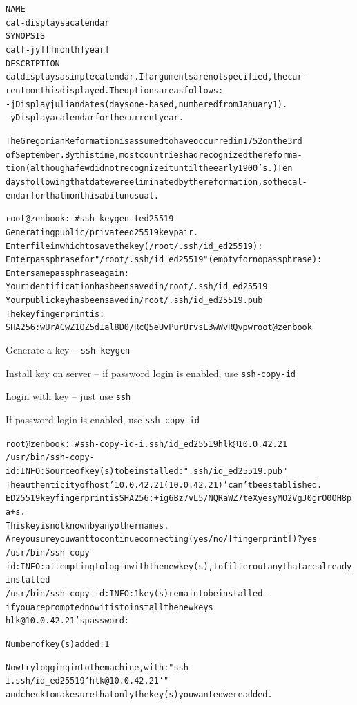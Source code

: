 \documentclass[Screen16to9,17pt]{foils}
\begin{document}
\begin{alltt}\footnotesize
\small
NAME
     cal - displays a calendar
SYNOPSIS
     cal [-jy] [[month]  year]
DESCRIPTION
   cal displays a simple calendar.  If arguments are not specified, the cur-
   rent month is displayed.  The options are as follows:
   -j      Display julian dates (days one-based, numbered from January 1).
   -y      Display a calendar for the current year.

The Gregorian Reformation is assumed to have occurred in 1752 on the 3rd
of September.  By this time, most countries had recognized the reforma-
tion (although a few did not recognize it until the early 1900's.)  Ten
days following that date were eliminated by the reformation, so the cal-
endar for that month is a bit unusual.
\end{alltt}




\begin{alltt}\footnotesize
root@zenbook:~# ssh-keygen -t ed25519
Generating public/private ed25519 key pair.
Enter file in which to save the key (/root/.ssh/id_ed25519):
Enter passphrase for "/root/.ssh/id_ed25519" (empty for no passphrase):
Enter same passphrase again:
Your identification has been saved in /root/.ssh/id_ed25519
Your public key has been saved in /root/.ssh/id_ed25519.pub
The key fingerprint is:
SHA256:wUrACwZ1OZ5dIal8D0/RcQ5eUvPurUrvsL3wWvRQvpw root@zenbook
\end{alltt}


\begin{list2}
\item[1] Generate a key -- \verb+ssh-keygen+
\item[2] Install key on server -- if password login is enabled, use \verb+ssh-copy-id+
\item[3] Login with key -- just use \verb+ssh+
\end{list2}




If password login is enabled, use \verb+ssh-copy-id+

\begin{alltt}\footnotesize
root@zenbook:~# ssh-copy-id -i .ssh/id_ed25519 hlk@10.0.42.21
/usr/bin/ssh-copy-id: INFO: Source of key(s) to be installed: ".ssh/id_ed25519.pub"
The authenticity of host '10.0.42.21 (10.0.42.21)' can't be established.
ED25519 key fingerprint is SHA256:+ig6Bz7vL5/NQRaWZ7teXyesyMO2VgJ0grO0OH8pa+s.
This key is not known by any other names.
Are you sure you want to continue connecting (yes/no/[fingerprint])? yes
/usr/bin/ssh-copy-id: INFO: attempting to log in with the new key(s), to filter out any that are already installed
/usr/bin/ssh-copy-id: INFO: 1 key(s) remain to be installed -- if you are prompted now it is to install the new keys
hlk@10.0.42.21's password:

Number of key(s) added: 1

Now try logging into the machine, with: "ssh -i .ssh/id_ed25519 'hlk@10.0.42.21'"
and check to make sure that only the key(s) you wanted were added.
\end{alltt}
\end{document}
